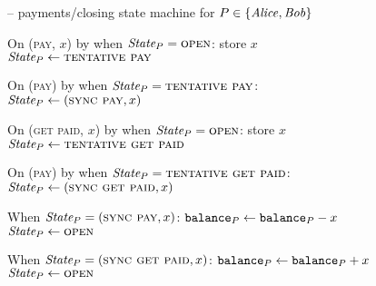 \begin{figure}[H]
  \begin{systembox}{\fchan{} -- payments/closing state machine for $P \in
  \{\mathit{Alice}, \mathit{Bob}\}$}
    \begin{algorithmic}[1]
      \State On (\textsc{pay}, $x$) by \environment when $\itistate_P =
      \textsc{open}$: 
      \label{code:functionality:pay-close:when-tent-pay}
      \Indent
        \State store $x$
        \State $\itistate_P \gets \textsc{tentative pay}$
      \EndIndent
      \Statex

      \State On (\textsc{pay}) by \adversary when $\itistate_P =
      \textsc{tentative pay}$: 
      \label{code:functionality:pay-close:when-sync-pay}
      \Indent
        \State $\itistate_P \gets (\textsc{sync pay}, x)$
      \EndIndent
      \Statex

      \State On (\textsc{get paid}, $x$) by \environment when $\itistate_P =
      \textsc{open}$: 
      \label{code:functionality:pay-close:when-tent-get-paid}
      \Indent
        \State store $x$
        \State $\itistate_P \gets \textsc{tentative get paid}$
      \EndIndent
      \Statex

      \State On (\textsc{pay}) by \adversary when $\itistate_P =
      \textsc{tentative get paid}$: 
      \label{code:functionality:pay-close:when-sync-get-paid}
      \Indent
        \State $\itistate_P \gets (\textsc{sync get paid}, x)$
      \EndIndent
      \Statex

      \State When $\itistate_P = (\textsc{sync pay}, x)$:
      \Indent
          \State $\texttt{balance}_{P} \gets \texttt{balance}_{P} - x$
          \State {}
          \State $\itistate_P \gets \textsc{open}$
          \label{code:functionality:pay-close:pay-end}
        \EndIf
      \EndIndent
      \Statex

      \State When $\itistate_P = (\textsc{sync get paid}, x)$:
      \Indent
          \State $\texttt{balance}_{P} \gets \texttt{balance}_{P} + x$
          \State {}
          \State $\itistate_P \gets \textsc{open}$
          \label{code:functionality:pay-close:get-paid-end}
        \EndIf
      \EndIndent
      \Statex


\end{algorithmic}
\end{systembox}
\end{figure}
